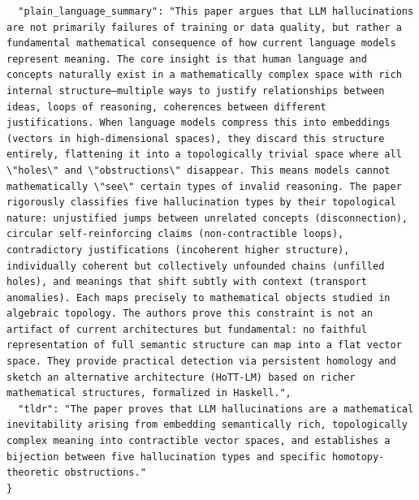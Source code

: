 \documentclass[11pt]{article}
\begin{document}
\begin{verbatim}
  "plain_language_summary": "This paper argues that LLM hallucinations are not primarily failures of training or data quality, but rather a fundamental mathematical consequence of how current language models represent meaning. The core insight is that human language and concepts naturally exist in a mathematically complex space with rich internal structure—multiple ways to justify relationships between ideas, loops of reasoning, coherences between different justifications. When language models compress this into embeddings (vectors in high-dimensional spaces), they discard this structure entirely, flattening it into a topologically trivial space where all \"holes\" and \"obstructions\" disappear. This means models cannot mathematically \"see\" certain types of invalid reasoning. The paper rigorously classifies five hallucination types by their topological nature: unjustified jumps between unrelated concepts (disconnection), circular self-reinforcing claims (non-contractible loops), contradictory justifications (incoherent higher structure), individually coherent but collectively unfounded chains (unfilled holes), and meanings that shift subtly with context (transport anomalies). Each maps precisely to mathematical objects studied in algebraic topology. The authors prove this constraint is not an artifact of current architectures but fundamental: no faithful representation of full semantic structure can map into a flat vector space. They provide practical detection via persistent homology and sketch an alternative architecture (HoTT-LM) based on richer mathematical structures, formalized in Haskell.",
  "tldr": "The paper proves that LLM hallucinations are a mathematical inevitability arising from embedding semantically rich, topologically complex meaning into contractible vector spaces, and establishes a bijection between five hallucination types and specific homotopy-theoretic obstructions."
}
\end{verbatim}
\end{document}
